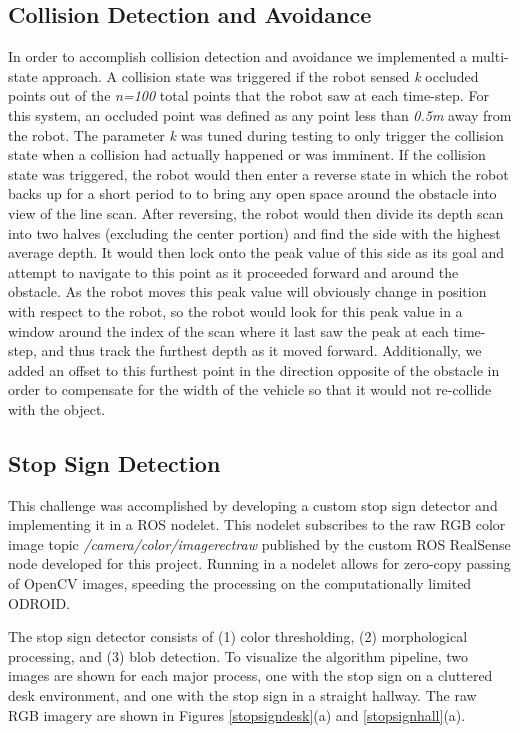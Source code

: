 \documentclass[letterpaper, 10 pt, conference]{ieeeconf}  %
\begin{document}
\subsection{Collision Detection and Avoidance}
In order to accomplish collision detection and avoidance we implemented a multi-state approach. A collision state was triggered if the robot sensed \textit{k} occluded points out of the \textit{n=100} total points that the robot saw at each time-step. For this system, an occluded point was defined as any point less than \textit{0.5m} away from the robot. The parameter \textit{k} was tuned during testing to only trigger the collision state when a collision had actually happened or was imminent. If the collision state was triggered, the robot would then enter a reverse state in which the robot backs up for a short period to to bring any open space around the obstacle into view of the line scan. After reversing, the robot would then divide its depth scan into two halves (excluding the center portion) and find the side with the highest average depth. It would then lock onto the peak  value of this side as its goal and attempt to navigate to this point as it proceeded forward and around the obstacle. As the robot moves this peak value will obviously change in position with respect to the robot, so the robot would look for this peak value in a window around the index of the scan where it last saw the peak at each time-step, and thus track the furthest depth as it moved forward. Additionally, we added an offset to this furthest point in the direction opposite of the obstacle in order to compensate for the width of the vehicle so that it would not re-collide with the object.

\subsection{Stop Sign Detection}

This challenge was accomplished by developing a custom stop sign detector and implementing it in a ROS nodelet. This nodelet subscribes to the raw RGB color image topic \textit{/camera/color/image\textunderscore{}rect\textunderscore{}raw} published by the custom ROS RealSense node developed for this project. Running in a nodelet allows for zero-copy passing of OpenCV images, speeding the processing on the computationally limited ODROID.

The stop sign detector consists of (1) color thresholding, (2) morphological processing, and (3) blob detection. To visualize the algorithm pipeline, two images are shown for each major process, one with the stop sign on a cluttered desk environment, and one with the stop sign in a straight hallway. The raw RGB imagery are shown in Figures \ref{stopsigndesk}(a) and \ref{stopsignhall}(a).
\end{document}
